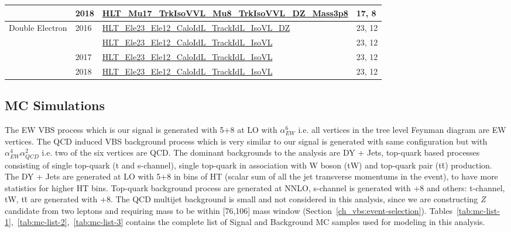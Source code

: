 \begin{table}[!ht]
{\begin{tabular}{clll}
      \cmidrule(lr){2-4}
              & \multirow{1}{*}{2018} & \url{HLT_Mu17_TrkIsoVVL_Mu8_TrkIsoVVL_DZ_Mass3p8} & 17, 8  \GeV{}       \\
      \midrule
      \multirow{4}{*}{Double Electron}
              & \multirow{2}{*}{2016} & \url{HLT_Ele23_Ele12_CaloIdL_TrackIdL_IsoVL_DZ}   & 23, 12 \GeV{}       \\
              &                       & \url{HLT_Ele23_Ele12_CaloIdL_TrackIdL_IsoVL}      & 23, 12 \GeV{}       \\
      \cmidrule(lr){2-4}
              & \multirow{1}{*}{2017} & \url{HLT_Ele23_Ele12_CaloIdL_TrackIdL_IsoVL}      & 23, 12 \GeV{}       \\
      \cmidrule(lr){2-4}
              & \multirow{1}{*}{2018} & \url{HLT_Ele23_Ele12_CaloIdL_TrackIdL_IsoVL}      & 23, 12 \GeV{}       \\
      \bottomrule
    \end{tabular}}\label{tab:hlt-paths}
\end{table}

\subsection{
  MC Simulations
}

The \gls{EW} \gls{VBS} process which is our signal is
generated with \MADGRAPH{}5+\PYTHIA{}8 at \gls{LO} with \( \alpha_{EW}^{6} \)
i.e.
all vertices in the tree level Feynman diagram are \gls{EW} vertices.
The \gls{QCD} induced \gls{VBS} background process which is very
similar to our signal is generated with same configuration
but with \( \alpha_{EW}^{4} \alpha_{QCD}^{2} \) i.e.
two of the six vertices are \gls{QCD}. The dominant backgrounds to the analysis
are \gls{DY} + Jets, top-quark based processes consisting of
single top-quark (t and s-channel),
single top-quark in association with W boson (tW) and top-quark pair (t\=t) production.
The \gls{DY} + Jets are generated at \gls{LO} with \MADGRAPH{}5+\PYTHIA{}8
in bins of HT
(scalar sum of all the jet transverse momentums in the event), to have more statistics
for higher HT bins. Top-quark background process are generated at \gls{NNLO},
s-channel is generated with \MGvATNLO+\PYTHIA{}8 and others:
t-channel, tW, t\=t are generated with \POWHEG{}+\PYTHIA{}8. The QCD
multijet background is small and not considered in this analysis, since we
are constructing \textit{Z} candidate
from two leptons and requiring mass to be within [76,106] \GeV{} mass window (Section~\ref{ch_vbs:event-selection}).
Tables~\ref{tab:mc-list-1},~\ref{tab:mc-list-2},~\ref{tab:mc-list-3} contains
the complete list of Signal and Background MC samples used for modeling in this analysis.


